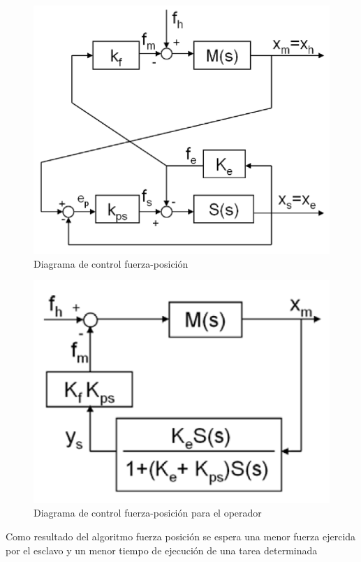\begin{figure}[htb!]
\includegraphics[scale=0.5]{FiguresP/force-pos}
\caption{Diagrama de control fuerza-posición}
\end{figure}


\begin{figure}[htb!]
\includegraphics[scale=0.5]{FiguresP/force-pos-operator}
\caption{Diagrama de control fuerza-posición para el  operador}
\end{figure}

Como resultado del algoritmo fuerza posición se espera una menor fuerza ejercida por el esclavo y un menor tiempo de ejecución de una tarea determinada







